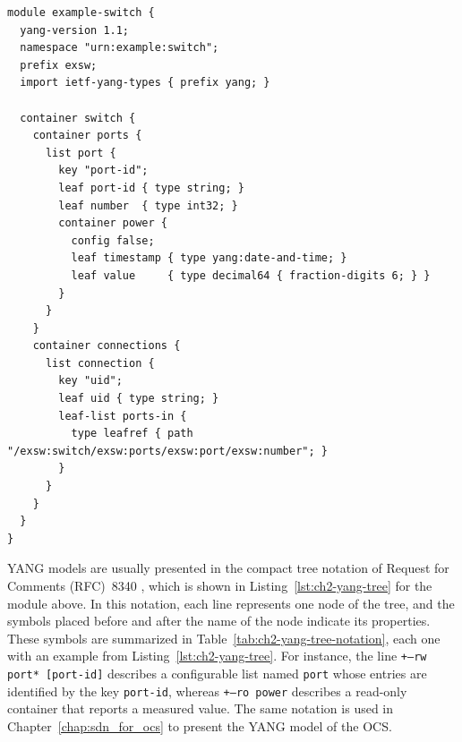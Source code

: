 \begin{lstlisting}[language={}, keepspaces=true, caption={Simplified example of a YANG module describing the ports and connections of a switch.}, label={lst:ch2-yang-example}]
module example-switch {
  yang-version 1.1;
  namespace "urn:example:switch";
  prefix exsw;
  import ietf-yang-types { prefix yang; }

  container switch {
    container ports {
      list port {
        key "port-id";
        leaf port-id { type string; }
        leaf number  { type int32; }
        container power {
          config false;
          leaf timestamp { type yang:date-and-time; }
          leaf value     { type decimal64 { fraction-digits 6; } }
        }
      }
    }
    container connections {
      list connection {
        key "uid";
        leaf uid { type string; }
        leaf-list ports-in {
          type leafref { path "/exsw:switch/exsw:ports/exsw:port/exsw:number"; }
        }
      }
    }
  }
}
\end{lstlisting}

YANG models are usually presented in the compact tree notation of Request for Comments (RFC)~8340 \cite{rfc8340}, which is shown in Listing~\ref{lst:ch2-yang-tree} for the module above.
In this notation, each line represents one node of the tree, and the symbols placed before and after the name of the node indicate its properties.
These symbols are summarized in Table~\ref{tab:ch2-yang-tree-notation}, each one with an example from Listing~\ref{lst:ch2-yang-tree}.
For instance, the line \texttt{+--rw port* [port-id]} describes a configurable list named \texttt{port} whose entries are identified by the key \texttt{port-id}, whereas \texttt{+--ro power} describes a read-only container that reports a measured value.
The same notation is used in Chapter~\ref{chap:sdn_for_ocs} to present the YANG model of the OCS.

